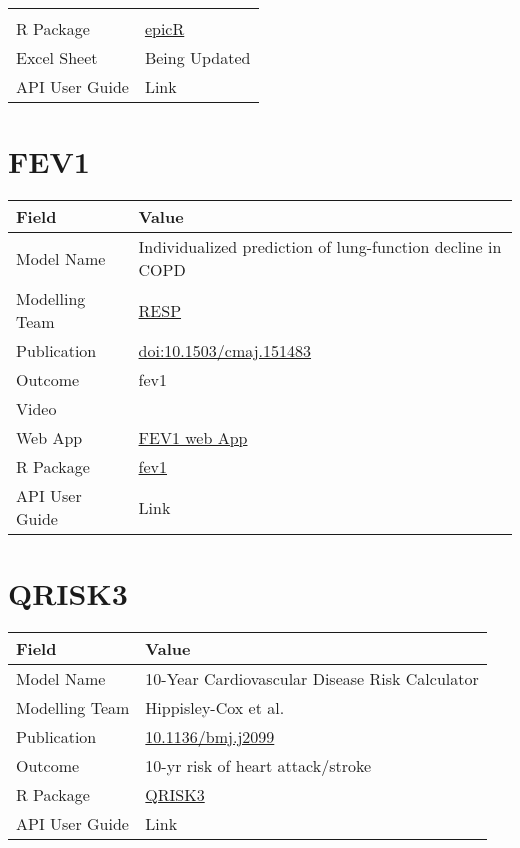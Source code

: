 \documentclass[
]{book}
\begin{document}
\begin{longtable}[]{@{}ll@{}}
\begin{minipage}[t]{0.49\columnwidth}
\end{minipage}\tabularnewline
\begin{minipage}[t]{0.45\columnwidth}\raggedright
R Package\strut
\end{minipage} & \begin{minipage}[t]{0.49\columnwidth}\raggedright
\href{https://github.com/resplab/epicR}{epicR}\strut
\end{minipage}\tabularnewline
\begin{minipage}[t]{0.45\columnwidth}\raggedright
Excel Sheet\strut
\end{minipage} & \begin{minipage}[t]{0.49\columnwidth}\raggedright
Being Updated\strut
\end{minipage}\tabularnewline
\begin{minipage}[t]{0.45\columnwidth}\raggedright
API User Guide\strut
\end{minipage} & \begin{minipage}[t]{0.49\columnwidth}\raggedright
Link\strut
\end{minipage}\tabularnewline
\bottomrule
\end{longtable}

\hypertarget{fev1}{%
\chapter{FEV1}\label{fev1}}

\begin{longtable}[]{@{}ll@{}}
\toprule
Field & Value\tabularnewline
\midrule
\endhead
Model Name & Individualized prediction of lung-function decline in COPD\tabularnewline
Modelling Team & \href{http://resp.core.ubc.ca}{RESP}\tabularnewline
Publication & \href{https://doi.org/10.1503/cmaj.151483}{doi:10.1503/cmaj.151483}\tabularnewline
Outcome & fev1\tabularnewline
Video & \href{}{}\tabularnewline
Web App & \href{http://resp.core.ubc.ca/ipress/FEV1Pred}{FEV1 web App}\tabularnewline
R Package & \href{https://github.com/resplab/fev1}{fev1}\tabularnewline
API User Guide & Link\tabularnewline
\bottomrule
\end{longtable}

\hypertarget{qrisk3}{%
\chapter{QRISK3}\label{qrisk3}}

\begin{longtable}[]{@{}ll@{}}
\toprule
Field & Value\tabularnewline
\midrule
\endhead
Model Name & 10-Year Cardiovascular Disease Risk Calculator\tabularnewline
Modelling Team & Hippisley-Cox et al.\tabularnewline
Publication & \href{https://doi.org/10.1136/bmj.j2099}{10.1136/bmj.j2099}\tabularnewline
Outcome & 10-yr risk of heart attack/stroke\tabularnewline
R Package & \href{https://cran.r-project.org/package=QRISK3}{QRISK3}\tabularnewline
API User Guide & Link\tabularnewline
\bottomrule
\end{longtable}
\end{document}
